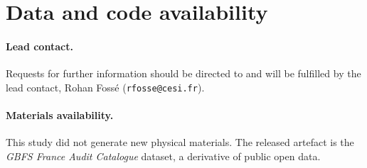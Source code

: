 \documentclass[11pt,a4paper]{article}
\begin{document}
\section{Data and code availability}

\paragraph{Lead contact.} Requests for further information should be
directed to and will be fulfilled by the lead contact, Rohan Foss\'e
(\texttt{rfosse@cesi.fr}).

\paragraph{Materials availability.} This study did not generate new
physical materials. The released artefact is the
\emph{GBFS France Audit Catalogue} dataset, a derivative of public open
data.
\end{document}
